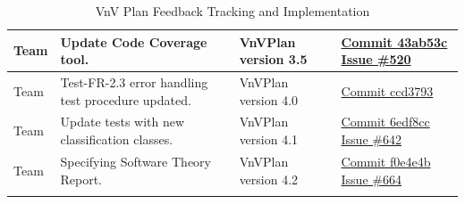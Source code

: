 \documentclass{article}
\begin{document}
\begin{longtable}{|p{2cm}|p{4.5cm}|p{3.5cm}|p{3cm}|}
    Team &
    Update Code Coverage tool. &
    VnVPlan version 3.5 & 
    \href{https://github.com/Team6-SixSense/audio360/commit/43ab53c}{Commit
        43ab53c}
    \newline
    \href{https://github.com/Team6-SixSense/audio360/issues/520}{Issue \#520} \\
    \hline

    Team &
    Test-FR-2.3 error handling test procedure updated. &
    VnVPlan version 4.0 & 
    \href{https://github.com/Team6-SixSense/audio360/commit/ccd3793}{Commit
        ccd3793} \\
    \hline

    Team &
    Update tests with new classification classes. &
    VnVPlan version 4.1 & 
    \href{https://github.com/Team6-SixSense/audio360/commit/6edf8cc}{Commit
        6edf8cc}
    \newline
    \href{https://github.com/Team6-SixSense/audio360/issues/642}{Issue \#642} \\
    \hline

    Team &
    Specifying Software Theory Report. &
    VnVPlan version 4.2 & 
    \href{https://github.com/Team6-SixSense/audio360/commit/f0e4e4b}{Commit
        f0e4e4b}
    \newline
    \href{https://github.com/Team6-SixSense/audio360/issues/664}{Issue \#664} \\
    \hline

    \caption{VnV Plan Feedback Tracking and Implementation}
\end{longtable}
\end{document}
